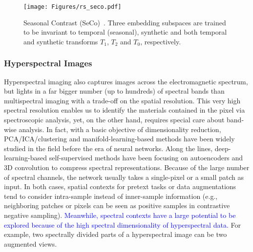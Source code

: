 \documentclass[lettersize,journal]{IEEEtran}
\begin{document}
\begin{figure}
\centering
\texttt{[image: Figures/rs\_seco.pdf]}
\caption[seco]{Seasonal Contrast (SeCo)~\cite{manas2021seasonal}. Three embedding subspaces are trained to be invariant to temporal (seasonal), synthetic and both temporal and synthetic transforms $T_{1}$, $T_{2}$ and $T_{0}$, respectively.}
\label{fig:seco}
\end{figure}

\subsubsection{Hyperspectral Images}

Hyperspectral imaging also captures images across the electromagnetic spectrum, but lights in a far bigger number (up to hundreds) of spectral bands than multispectral imaging with a trade-off on the spatial resolution. This very high spectral resolution enables us to identify the materials contained in the pixel via spectroscopic analysis, yet, on the other hand, requires special care about band-wise analysis. In fact, with a basic objective of dimensionality reduction, PCA/ICA/clustering and manifold-learning-based methods have been widely studied in the field before the era of neural networks. Along the lines, deep-learning-based self-supervised methods have been focusing on autoencoders and 3D convolution to compress spectral representations. Because of the large number of spectral channels, the network usually takes a single-pixel or a small patch as input. In both cases, spatial contexts for pretext tasks or data augmentations tend to consider intra-sample instead of inner-sample information (e.g., neighboring patches or pixels can be seen as positive samples in contrastive negative sampling). \textcolor{blue}{Meanwhile, spectral contexts have a large potential to be explored because of the high spectral dimensionality of hyperspectral data.} For example, two spectrally divided parts of a hyperspectral image can be two augmented views.
\end{document}
